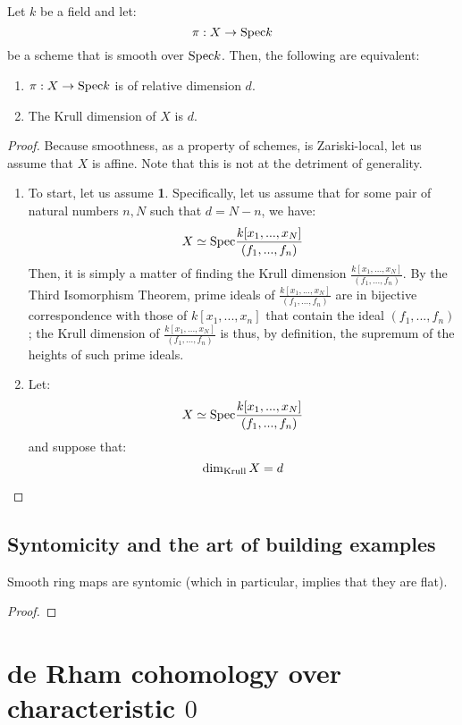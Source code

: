                 \begin{proposition} \label{prop: dimensions_of_smoothn_morphisms_over_fields}
                    Let $k$ be a field and let:
                        $$\pi: X \to \mathrm{Spec} k$$
                    be a scheme that is smooth over $\mathrm{Spec} k$. Then, the following are equivalent:
                        \begin{enumerate}
                            \item $\pi: X \to \mathrm{Spec} k$ is of relative dimension $d$. 
                            \item The Krull dimension of $X$ is $d$. 
                        \end{enumerate}
                \end{proposition}
                    \begin{proof}
                        Because smoothness, as a property of schemes, is Zariski-local, let us assume that $X$ is affine. Note that this is not at the detriment of generality. 
                        \begin{enumerate}
                            \item To start, let us assume \textbf{1}. Specifically, let us assume that for some pair of natural numbers $n, N$ such that $d = N - n$, we have:
                                $$X \simeq \mathrm{Spec} \frac{k[x_1, ..., x_N]}{(f_1, ...,f_n)}$$
                            Then, it is simply a matter of finding the Krull dimension $\frac{k[x_1, ..., x_N]}{(f_1, ...,f_n)}$. By the Third Isomorphism Theorem, prime ideals of $\frac{k[x_1, ..., x_N]}{(f_1, ...,f_n)}$ are in bijective correspondence with those of $k[x_1, ..., x_n]$ that contain the ideal $(f_1, ..., f_n)$; the Krull dimension of $\frac{k[x_1, ..., x_N]}{(f_1, ...,f_n)}$ is thus, by definition, the supremum of the heights of such prime ideals. 
                            \item Let:
                                $$X \simeq \mathrm{Spec} \frac{k[x_1, ..., x_N]}{(f_1, ..., f_n)}$$
                            and suppose that:
                                $$\dim_{\mathrm{Krull}} X = d$$
                            
                        \end{enumerate}
                    \end{proof}
        
        \subsection{Syntomicity and the art of building examples}
            \begin{proposition} \label{prop: smooth_maps_are_syntomic}
                Smooth ring maps are syntomic (which in particular, implies that they are flat).
            \end{proposition}
                \begin{proof}
                    
                \end{proof}
     
    \section{de Rham cohomology over characteristic \texorpdfstring{$0$}{}} \label{section: algebraic_de_rham_cohomology_over_characteristic_0}